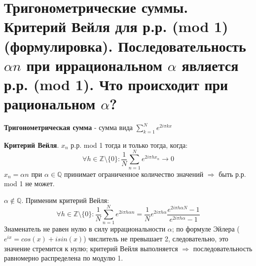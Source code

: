 \setcounter{section}{38}
\section{Тригонометрические суммы. Критерий Вейля для р.р. (mod 1) (формулировка). Последовательность $\alpha n$ при иррациональном $\alpha$ является р.р. (mod 1). Что происходит при рациональном $\alpha$?}

\textbf{Тригонометрическая сумма} - сумма вида $\sum_{k=1}^N e^{2i\pi kx}$ \par
\textbf{Критерий Вейля}. $x_n$ р.р. mod 1 тогда и только тогда, когда:
\[
\forall h \in \mathbb{Z} \setminus \{ 0 \}: \frac{1}{N}\sum_{n=1}^N e^{2i\pi h x_n} \to 0
\]
$x_n = \alpha n$ при $\alpha \in \mathbb{Q}$ принимает ограниченное количество значений $\Rightarrow$ быть р.р. mod 1 не может. \par
$\alpha \notin \mathbb{Q}$. Применим критерий Вейля:
\[
\forall h \in \mathbb{Z} \setminus \{ 0 \}: \frac{1}{N}\sum_{n=1}^N e^{2i\pi h \alpha n} = \frac{1}{N} e^{2i\pi h \alpha} \frac{e^{2i\pi h \alpha N} - 1}{e^{2i\pi h \alpha} - 1}
\]
Знаменатель не равен нулю в силу иррациональности $\alpha$; по формуле Эйлера ($e^{ix} = cos(x) + isin(x)$) числитель не превышает 2, следовательно, это значение стремится к нулю; критерий Вейля выполняется $\Rightarrow$ последовательность равномерно распределена по модулю 1.
